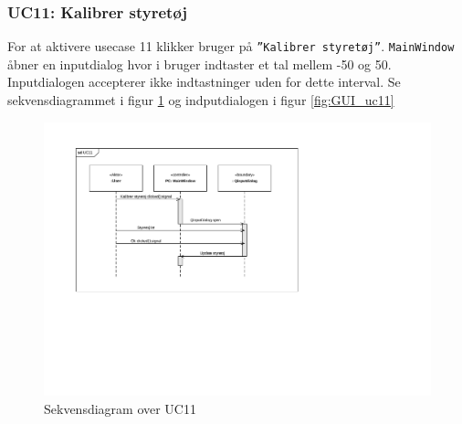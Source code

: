 \clearpage

\subsubsection{UC11: Kalibrer styretøj}
For at aktivere usecase 11 klikker bruger på \texttt{''Kalibrer styretøj''}.
\texttt{MainWindow} åbner en inputdialog hvor i bruger indtaster et tal mellem -50 og 50. Inputdialogen accepterer ikke indtastninger uden for dette interval. Se sekvensdiagrammet i figur \ref{fig:cd_uc11} og indputdialogen i figur \ref{fig:GUI_uc11}

\begin{figure}[H]
\centering
\includegraphics[width=\textwidth* 2/3,height=\textwidth* 4/10 ]{../fig/diagrammer/pc/sd_uc11.pdf}
\caption{Sekvensdiagram over UC11}
\label{fig:cd_uc11}
\end{figure}

